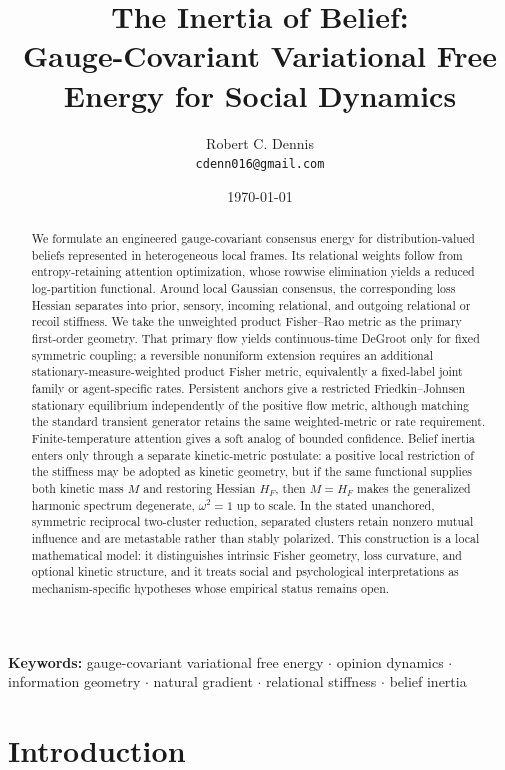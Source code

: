 \documentclass[12pt]{article}
\title{The Inertia of Belief:\\Gauge-Covariant Variational Free Energy for Social Dynamics}
\author{
Robert C. Dennis\\
\texttt{cdenn016@gmail.com}
}
\date{\today}
\begin{document}
\maketitle



\begin{abstract}
We formulate an engineered gauge-covariant consensus energy for distribution-valued beliefs represented in heterogeneous local frames. Its relational weights follow from entropy-retaining attention optimization, whose rowwise elimination yields a reduced log-partition functional. Around local Gaussian consensus, the corresponding loss Hessian separates into prior, sensory, incoming relational, and outgoing relational or recoil stiffness. We take the unweighted product Fisher--Rao metric as the primary first-order geometry. That primary flow yields continuous-time DeGroot only for fixed symmetric coupling; a reversible nonuniform extension requires an additional stationary-measure-weighted product Fisher metric, equivalently a fixed-label joint family or agent-specific rates. Persistent anchors give a restricted Friedkin--Johnsen stationary equilibrium independently of the positive flow metric, although matching the standard transient generator retains the same weighted-metric or rate requirement. Finite-temperature attention gives a soft analog of bounded confidence. Belief inertia enters only through a separate kinetic-metric postulate: a positive local restriction of the stiffness may be adopted as kinetic geometry, but if the same functional supplies both kinetic mass $M$ and restoring Hessian $H_F$, then $M=H_F$ makes the generalized harmonic spectrum degenerate, $\omega^2=1$ up to scale. In the stated unanchored, symmetric reciprocal two-cluster reduction, separated clusters retain nonzero mutual influence and are metastable rather than stably polarized. This construction is a local mathematical model: it distinguishes intrinsic Fisher geometry, loss curvature, and optional kinetic structure, and it treats social and psychological interpretations as mechanism-specific hypotheses whose empirical status remains open.
\end{abstract}



\noindent\textbf{Keywords:} gauge-covariant variational free energy $\cdot$ opinion dynamics $\cdot$ information geometry $\cdot$ natural gradient $\cdot$ relational stiffness $\cdot$ belief inertia

\section{Introduction}
\end{document}
